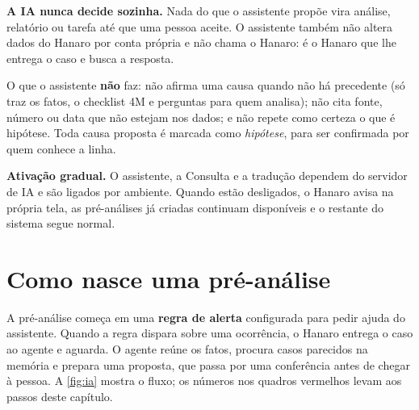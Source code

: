 \begin{remark}
\textbf{A IA nunca decide sozinha.} Nada do que o assistente propõe vira análise,
relatório ou tarefa até que uma pessoa aceite. O assistente também não altera dados do
Hanaro por conta própria e não chama o Hanaro: é o Hanaro que lhe entrega o caso e
busca a resposta.
\end{remark}

O que o assistente \textbf{não} faz: não afirma uma causa quando não há precedente (só
traz os fatos, o checklist 4M e perguntas para quem analisa); não cita fonte, número ou
data que não estejam nos dados; e não repete como certeza o que é hipótese. Toda causa
proposta é marcada como \emph{hipótese}, para ser confirmada por quem conhece a linha.

\begin{remark}[info]
\textbf{Ativação gradual.} O assistente, a Consulta e a tradução dependem do servidor
de IA e são ligados por ambiente. Quando estão desligados, o Hanaro avisa na própria
tela, as pré-análises já criadas continuam disponíveis e o restante do sistema segue
normal.
\end{remark}

\section{Como nasce uma pré-análise}

A pré-análise começa em uma \textbf{regra de alerta} configurada para pedir ajuda do
assistente. Quando a regra dispara sobre uma ocorrência, o Hanaro entrega o caso ao
agente e aguarda. O agente reúne os fatos, procura casos parecidos na memória e prepara
uma proposta, que passa por uma conferência antes de chegar à pessoa. A
\autoref{fig:ia} mostra o fluxo; os números nos quadros vermelhos levam aos passos
deste capítulo.

